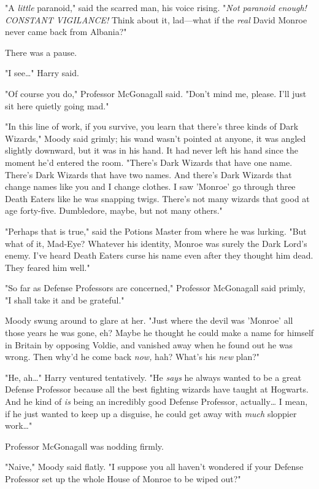 "A \emph{little} paranoid," said the scarred man, his voice rising. "\emph{Not paranoid enough! CONSTANT VIGILANCE!} Think about it, lad---what if the \emph{real} David Monroe never came back from Albania?"

There was a pause.

"I see{\ldots}" Harry said.

"Of course you do," Professor McGonagall said. "Don't mind me, please. I'll just sit here quietly going mad."

"In this line of work, if you survive, you learn that there's three kinds of Dark Wizards," Moody said grimly; his wand wasn't pointed at anyone, it was angled slightly downward, but it was in his hand. It had never left his hand since the moment he'd entered the room. "There's Dark Wizards that have one name. There's Dark Wizards that have two names. And there's Dark Wizards that change names like you and I change clothes. I saw 'Monroe' go through three Death Eaters like he was snapping twigs. There's not many wizards that good at age forty-five. Dumbledore, maybe, but not many others."

"Perhaps that is true," said the Potions Master from where he was lurking. "But what of it, Mad-Eye? Whatever his identity, Monroe was surely the Dark Lord's enemy. I've heard Death Eaters curse his name even after they thought him dead. They feared him well."

"So far as Defense Professors are concerned," Professor McGonagall said primly, "I shall take it and be grateful."

Moody swung around to glare at her. "Just where the devil was 'Monroe' all those years he was gone, eh? Maybe he thought he could make a name for himself in Britain by opposing Voldie, and vanished away when he found out he was wrong. Then why'd he come back \emph{now,} hah? What's his \emph{new} plan?"

"He, ah{\ldots}" Harry ventured tentatively. "He \emph{says} he always wanted to be a great Defense Professor because all the best fighting wizards have taught at Hogwarts. And he kind of \emph{is} being an incredibly good Defense Professor, actually{\ldots} I mean, if he just wanted to keep up a disguise, he could get away with \emph{much} sloppier work{\ldots}"

Professor McGonagall was nodding firmly.

"Naive," Moody said flatly. "I suppose you all haven't wondered if your Defense Professor set up the whole House of Monroe to be wiped out?"

